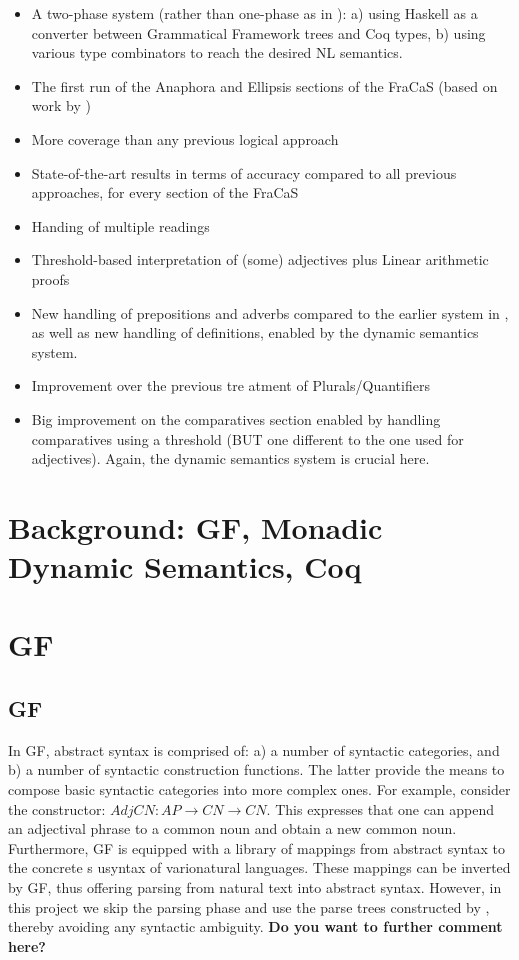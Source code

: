 \documentclass{article}
\begin{document}
\begin{itemize}
 \item  A two-phase system (rather than one-phase as in  \citet{bernardy_type_2017}): a) using Haskell as a converter between Grammatical Framework trees and Coq types, b) using various type combinators to reach the desired NL semantics. 
  \item  The first run of the Anaphora and Ellipsis sections of the FraCaS (based on work by \citet{bernardy_jolli})
 \item  More coverage than any previous logical approach
  \item  State-of-the-art results in terms of accuracy compared to all previous approaches, for every section of the FraCaS
  \item  Handing of multiple readings
  \item  Threshold-based interpretation of (some) adjectives plus Linear arithmetic proofs
  \item  New handling of prepositions and adverbs compared to the earlier system in  \citet{bernardy_type_2017}, as well as new handling of definitions, enabled by the dynamic semantics system. 
  \item  Improvement over the previous tre
atment of Plurals/Quantifiers
 \item  Big improvement on the comparatives section  enabled by handling  comparatives using a threshold (BUT one different to the one used for adjectives). Again, the dynamic semantics system is crucial here. 




\end{itemize}
\section{Background: GF, Monadic Dynamic Semantics, Coq}


\section{GF}

\subsection{GF}
In GF, abstract syntax is comprised of: a) a number of syntactic
categories, and b) a number of syntactic construction functions. The latter
provide the means to compose basic syntactic categories into more complex
ones.  For example, consider the constructor: $AdjCN : AP → CN → CN$. This  expresses
that one can append an adjectival phrase to a common noun and obtain
a new common noun. Furthermore,  GF is equipped  with a library of mappings from abstract
syntax to the concrete s usyntax of varionatural languages. These mappings can be inverted by GF, thus offering
parsing from natural text into abstract syntax. However, in this project we skip the
parsing phase and use the parse trees constructed by \citet{Ljunglof:2012},
thereby avoiding any syntactic ambiguity. \textbf{Do you want to further comment here?}
\end{document}
